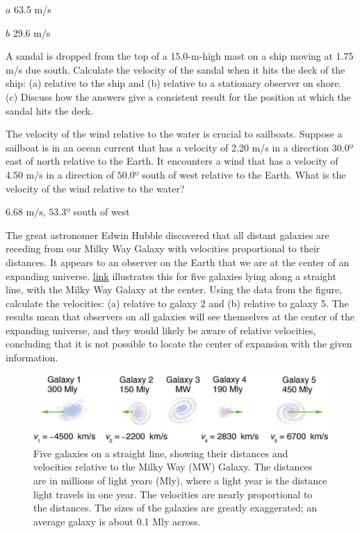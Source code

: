 \documentclass[
]{book}
\newenvironment{problems-exercises}{}{}
\begin{document}
\begin{problems-exercises}
\leavevmode\hypertarget{fs-id1868571}{}%
\(a\) 63.5 m/s

\(b\) 29.6 m/s

\hypertarget{fs-id2022863}{}
\leavevmode\hypertarget{fs-id2022864}{}%
A sandal is dropped from the top of a 15.0-m-high mast on a ship moving
at 1.75 m/s due south. Calculate the velocity of the sandal when it hits
the deck of the ship: (a) relative to the ship and (b) relative to a
stationary observer on shore. (c) Discuss how the answers give a
consistent result for the position at which the sandal hits the deck.

\hypertarget{fs-id1924931}{}
\leavevmode\hypertarget{fs-id1924932}{}%
The velocity of the wind relative to the water is crucial to sailboats.
Suppose a sailboat is in an ocean current that has a velocity of 2.20
m/s in a direction \(30.0º{}\) east of north relative to the Earth. It
encounters a wind that has a velocity of 4.50 m/s in a direction of
\(50.0º{}\) south of west relative to the Earth. What is the velocity of
the wind relative to the water?

\leavevmode\hypertarget{fs-id2080382}{}%
\({6\text{.}\text{68\ m/s}}{}\), \({\text{53}\text{.}3º}{}\) south of west

\hypertarget{fs-id2150516}{}
\leavevmode\hypertarget{fs-id2150517}{}%
The great astronomer Edwin Hubble discovered that all distant galaxies
are receding from our Milky Way Galaxy with velocities proportional to
their distances. It appears to an observer on the Earth that we are at
the center of an expanding universe.
\protect\hyperlink{import-auto-id1915192}{link} illustrates this
for five galaxies lying along a straight line, with the Milky Way Galaxy
at the center. Using the data from the figure, calculate the velocities:
(a) relative to galaxy 2 and (b) relative to galaxy 5. The results mean
that observers on all galaxies will see themselves at the center of the
expanding universe, and they would likely be aware of relative
velocities, concluding that it is not possible to locate the center of
expansion with the given information.

\begin{figure}
\hypertarget{import-auto-id1915192}{%
\centering
\includegraphics{images/Figure_03_05_07.jpg}
\caption{Five galaxies on a straight line, showing their distances and
velocities relative to the Milky Way (MW) Galaxy. The distances are in
millions of light years (Mly), where a light year is the distance light
travels in one year. The velocities are nearly proportional to the
distances. The sizes of the galaxies are greatly exaggerated; an average
galaxy is about 0.1 Mly
across.}\label{import-auto-id1915192}
}
\end{figure}


\end{problems-exercises}
\end{document}
